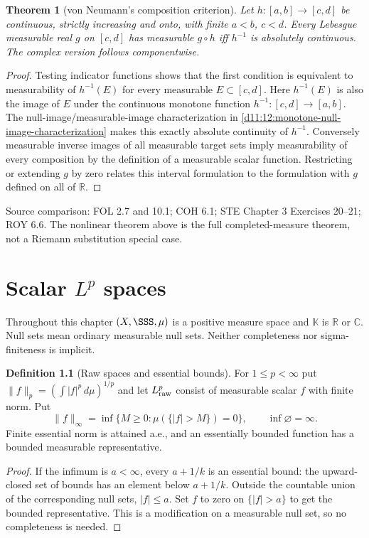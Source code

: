 \documentclass[11pt,oneside,openany]{book}
\newtheorem{theorem}{Theorem}[chapter]
\theoremstyle{definition}
\newtheorem{definition}[theorem]{Definition}
\theoremstyle{remark}
\newcommand{\R}{\mathbb R}\newcommand{\C}{\mathbb C}
\newcommand{\family}[1]{}
\newcommand{\source}[1]{\par\begingroup\small\sffamily\color{black!65}Source comparison: #1\par\endgroup}
\begin{document}
\begin{theorem}[von Neumann's composition criterion]\family{D11.09.von_neumann_composition}\label{d11:09:von-neumann-composition}
Let $h:[a,b]\to[c,d]$ be continuous, strictly increasing and onto, with
finite $a<b$, $c<d$. Every Lebesgue measurable real $g$ on $[c,d]$
has measurable $g\circ h$ iff $h^{-1}$ is absolutely continuous.
The complex version follows componentwise.
\end{theorem}
\begin{proof}
Testing indicator functions shows that the first condition is equivalent
to measurability of $h^{-1}(E)$ for every measurable $E\subset[c,d]$.
Here $h^{-1}(E)$ is also the image of $E$ under the continuous monotone
function $h^{-1}:[c,d]\to[a,b]$. The null-image/measurable-image
characterization in \cref{d11:12:monotone-null-image-characterization}
makes this exactly absolute continuity of $h^{-1}$. Conversely measurable
inverse images of all measurable target sets imply measurability of every
composition by the definition of a measurable scalar function. Restricting
or extending $g$ by zero relates this interval formulation to the formulation
with $g$ defined on all of $\R$.
\end{proof}
\source{FOL 2.7 and 10.1; COH 6.1; STE Chapter 3 Exercises 20--21; ROY 6.6. The nonlinear theorem above is the full completed-measure theorem, not a Riemann substitution special case.}



\chapter{Scalar \texorpdfstring{$L^p$}{Lp} spaces}\label{ch:d11-10}

Throughout this chapter $(X,\SSS,\mu)$ is a positive measure space and
$\mathbb K$ is $\R$ or $\C$. Null sets mean ordinary measurable null sets.
Neither completeness nor sigma-finiteness is implicit.

\begin{definition}[Raw spaces and essential bounds]\family{D11.10.lp_definition}\label{d11:10:lp-definition}
For $1\leq p<\infty$ put
$\|f\|_p=(\int|f|^p\,d\mu)^{1/p}$ and let $L^p_{\rm raw}$ consist of
measurable scalar $f$ with finite norm. Put
\[
 \|f\|_\infty=\inf\{M\geq0:\mu(\{|f|>M\})=0\},\qquad
 \inf\varnothing=\infty.
\]
Finite essential norm is attained a.e., and an essentially bounded function
has a bounded measurable representative.
\end{definition}
\begin{proof}
If the infimum is $a<\infty$, every $a+1/k$ is an essential bound: the
upward-closed set of bounds has an element below $a+1/k$. Outside the
countable union of the corresponding null sets, $|f|\leq a$. Set $f$ to
zero on $\{|f|>a\}$ to get the bounded representative. This is a
modification on a measurable null set, so no completeness is needed.
\end{proof}
\end{document}
